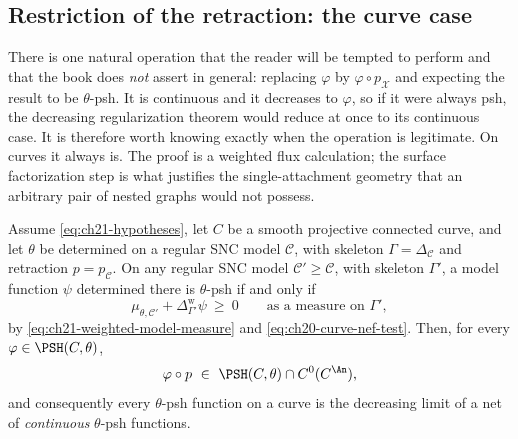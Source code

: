 \subsection{Restriction of the retraction: the curve case}
\label{sec:ch21-curve-retraction}

There is one natural operation that the reader will be tempted to perform
and that the book does \emph{not} assert in general: replacing
$\varphi$ by $\varphi\circ p_{\mathcal X}$ and expecting the result to
be $\theta$-psh.  It is continuous and it decreases to $\varphi$, so if
it were always psh, the decreasing regularization theorem
 would reduce at once to its
continuous case.  It is therefore worth knowing exactly when the operation
is legitimate.  On curves it always is.  The proof is a weighted flux
calculation; the surface factorization step is what justifies the
single-attachment geometry that an arbitrary pair of nested graphs would
not possess.

\begin{proposition}
\label{prop:ch21-curve-retraction}
Assume \eqref{eq:ch21-hypotheses}, let $C$ be a smooth projective connected
curve, and let $\theta$ be determined on a regular SNC model
$\mathcal C$, with skeleton $\Gamma=\Delta_{\mathcal C}$ and retraction
$p=p_{\mathcal C}$.  On any regular SNC model
$\mathcal C'\geq\mathcal C$, with skeleton $\Gamma'$, a model function
$\psi$ determined there is $\theta$-psh if and only if
\begin{equation}
\label{eq:ch21-curve-psh-test}
 \mu_{\theta,\mathcal C'}
 +\Delta^{\mathrm w}_{\Gamma'}\psi\ \geq\ 0
 \qquad\text{as a measure on }\Gamma' ,
\end{equation}
by \eqref{eq:ch21-weighted-model-measure} and
\eqref{eq:ch20-curve-nef-test}.  Then, for every
$\varphi\in\PSH(C,\theta)$,
\[
 \varphi\circ p\ \in\ \PSH(C,\theta)\cap C^0(C^{\An}),
\]
and consequently every $\theta$-psh function on a curve is the decreasing
limit of a net of \emph{continuous} $\theta$-psh functions.
\end{proposition}

